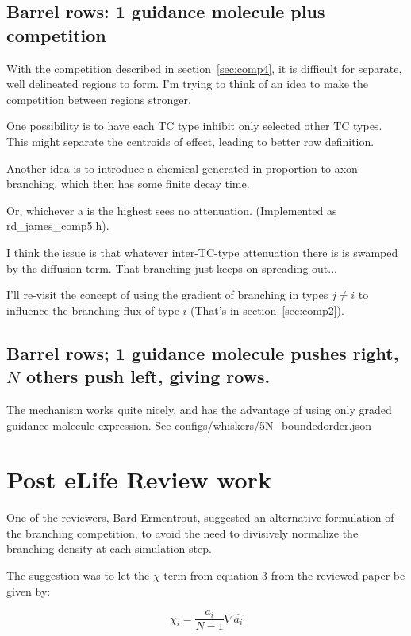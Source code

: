 \documentclass[11pt, a4paper]{article}
\newcommand{\code}[1]{\textsf{#1}}
\begin{document}
\subsection{Barrel rows: 1 guidance molecule plus competition}

With the competition described in section~\ref{sec:comp4}, it is
difficult for separate, well delineated regions to form. I'm trying to
think of an idea to make the competition between regions stronger.

One possibility is to have each TC type inhibit only selected other TC
types. This might separate the centroids of effect, leading to better
row definition.

Another idea is to introduce a chemical generated in proportion to
axon branching, which then has some finite decay time.

Or, whichever a is the highest sees no attenuation. (Implemented
as \code{rd\_james\_comp5.h}).

I think the issue is that whatever inter-TC-type attenuation there is
is swamped by the diffusion term. That branching just keeps on
spreading out...

I'll re-visit the concept of using the gradient of branching in types $j \ne i$
to influence the branching flux of type $i$ (That's in section~\ref{sec:comp2}).

\subsection{Barrel rows; 1 guidance molecule pushes right, $N$ others
push left, giving rows.}

The mechanism works quite nicely, and has the advantage of using only
graded guidance molecule expression.
See \code{configs/whiskers/5N\_boundedorder.json}


\section {Post eLife Review work}

One of the reviewers, Bard Ermentrout, suggested an alternative formulation of
the branching competition, to avoid the need to divisively normalize the
branching density at each simulation step.

The suggestion was to let the $\chi$ term from equation 3 from the reviewed
paper be given by:

\begin{equation}\label{eq:chibard}
\chi_i = \frac{a_i}{N-1} \nabla\hat{a_i}
\end{equation}
\end{document}
